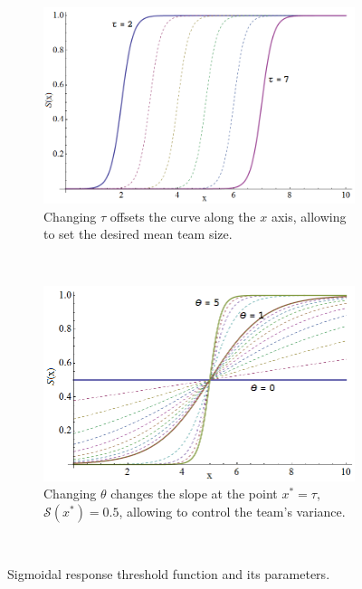 \documentclass[defaultstyle,12pt]{proposal}
\newcommand{\sig}{\mathcal{S}}
\begin{document}
\begin{figure}[!htb]
\centering\begin{subfigure}{.5\textwidth}
\centering\includegraphics[width=\textwidth]{../assets/sigmoid2.png}
\caption{Changing $\tau$ offsets the curve along the $x$ axis, allowing to set the desired mean team size.}\label{}
\end{subfigure}~
\centering\begin{subfigure}{.5\textwidth}
\centering\includegraphics[width=\textwidth]{../assets/sigmoid1.png}
\caption{Changing $\theta$ changes the slope at the point $x^* = \tau$, $\sig(x^*) = 0.5$, allowing to control the team's variance.}\label{}
\end{subfigure}~
\caption{Sigmoidal response threshold function and its parameters.}\label{fig:sig}
\end{figure}
\end{document}
